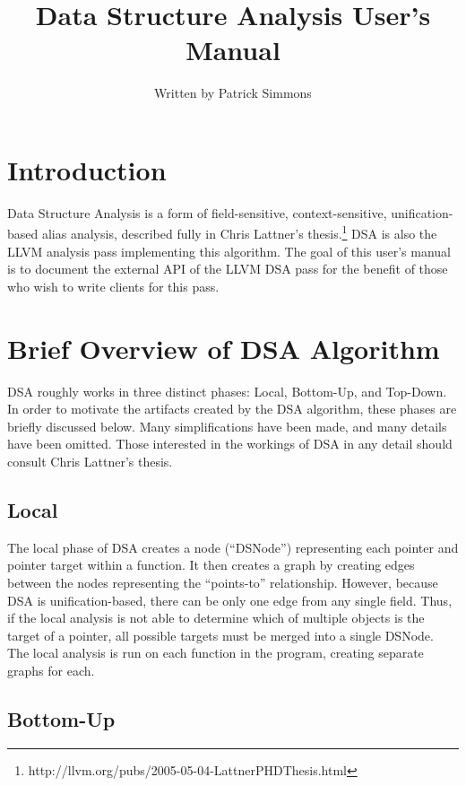 \documentclass{article}
\begin{document}
\title{Data Structure Analysis User's Manual}
\author{Written by Patrick Simmons}

\maketitle

\section{Introduction}

Data Structure Analysis is a form of field-sensitive,
context-sensitive, unification-based alias analysis, described fully
in Chris Lattner's
thesis.\footnote{http://llvm.org/pubs/2005-05-04-LattnerPHDThesis.html}
DSA is also the LLVM analysis pass implementing this algorithm.  The
goal of this user's manual is to document the external API of the LLVM
DSA pass for the benefit of those who wish to write clients for this
pass.

\section{Brief Overview of DSA Algorithm}

DSA roughly works in three distinct phases: Local, Bottom-Up, and
Top-Down.  In order to motivate the artifacts created by the DSA
algorithm, these phases are briefly discussed below.  Many
simplifications have been made, and many details have been omitted.
Those interested in the workings of DSA in any detail should consult
Chris Lattner's thesis.

\subsection{Local}

The local phase of DSA creates a node (``DSNode'') representing each
pointer and pointer target within a function.  It then creates a graph
by creating edges between the nodes representing the ``points-to''
relationship.  However, because DSA is unification-based, there can be
only one edge from any single field.  Thus, if the local analysis is
not able to determine which of multiple objects is the target of a
pointer, all possible targets must be merged into a single DSNode.
The local analysis is run on each function in the program, creating
separate graphs for each.

\subsection{Bottom-Up}
\end{document}
